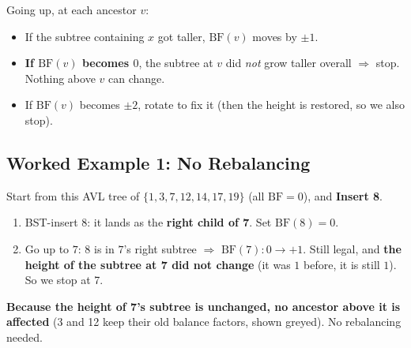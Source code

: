 \documentclass[11pt]{article}
\begin{document}
\begin{keybox}
Going up, at each ancestor $v$:
\begin{itemize}[leftmargin=1.4em,itemsep=1pt]
  \item If the subtree containing $x$ got taller, $\text{BF}(v)$ moves by $\pm 1$.
  \item \textbf{If $\text{BF}(v)$ becomes $0$}, the subtree at $v$ did \emph{not} grow taller overall $\Rightarrow$ \textcolor{greenO}{stop}. Nothing above $v$ can change.
  \item If $\text{BF}(v)$ becomes $\pm 2$, rotate to fix it (then the height is restored, so we also stop).
\end{itemize}
\end{keybox}

\subsection{Worked Example 1: No Rebalancing}

Start from this AVL tree of $\{1, 3, 7, 12, 14, 17, 19\}$ (all $\text{BF} = 0$), and \textbf{Insert 8}.

\begin{center}
\end{center}

\begin{examplebox}
\begin{enumerate}[leftmargin=1.4em,itemsep=2pt]
  \item BST-insert $8$: it lands as the \textbf{right child of 7}. Set $\text{BF}(8) = 0$.
  \item Go up to $7$: $8$ is in $7$'s right subtree $\Rightarrow$ $\text{BF}(7): 0 \to +1$. Still legal, and \textbf{the height of the subtree at 7 did not change} (it was $1$ before, it is still $1$). \textcolor{rustW}{So we stop at 7.}
\end{enumerate}
\textcolor{violetT}{\textbf{Because the height of 7's subtree is unchanged, no ancestor above it is affected}} (3 and 12 keep their old balance factors, shown greyed). \textcolor{greenO}{No rebalancing needed.}
\end{examplebox}
\end{document}
